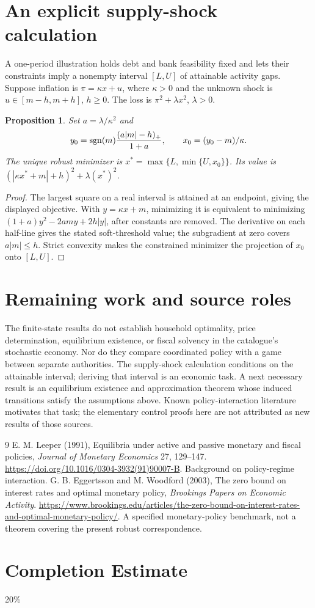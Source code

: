 \documentclass[11pt,a4paper]{article}
\newtheorem{proposition}[theorem]{Proposition}
\theoremstyle{definition}
\theoremstyle{remark}
\begin{document}
\section{An explicit supply-shock calculation}
A one-period illustration holds debt and bank feasibility fixed and lets their constraints imply a nonempty interval $[L,U]$ of attainable activity gaps. Suppose inflation is $\pi=\kappa x+u$, where $\kappa>0$ and the unknown shock is $u\in[m-h,m+h]$, $h\ge0$. The loss is $\pi^2+\lambda x^2$, $\lambda>0$.
\begin{proposition}
Set $a=\lambda/\kappa^2$ and
\[
 y_0=\operatorname{sgn}(m){(a|m|-h)_+\over1+a},
 \qquad x_0=(y_0-m)/\kappa.
\]
The unique robust minimizer is $x^*=\max\{L,\min\{U,x_0\}\}$. Its value is $(|\kappa x^*+m|+h)^2+\lambda(x^*)^2$.
\end{proposition}
\begin{proof}
The largest square on a real interval is attained at an endpoint, giving the displayed objective. With $y=\kappa x+m$, minimizing it is equivalent to minimizing
$(1+a)y^2-2amy+2h|y|$, after constants are removed. The derivative on each half-line gives the stated soft-threshold value; the subgradient at zero covers $a|m|\le h$. Strict convexity makes the constrained minimizer the projection of $x_0$ onto $[L,U]$.
\end{proof}
\section{Remaining work and source roles}
The finite-state results do not establish household optimality, price determination, equilibrium existence, or fiscal solvency in the catalogue's stochastic economy. Nor do they compare coordinated policy with a game between separate authorities. The supply-shock calculation conditions on the attainable interval; deriving that interval is an economic task. A next necessary result is an equilibrium existence and approximation theorem whose induced transitions satisfy the assumptions above. Known policy-interaction literature motivates that task; the elementary control proofs here are not attributed as new results of those sources.
\begin{thebibliography}{9}
 E. M. Leeper (1991), Equilibria under active and passive monetary and fiscal policies, \emph{Journal of Monetary Economics} 27, 129--147. \url{https://doi.org/10.1016/0304-3932(91)90007-B}. Background on policy-regime interaction.
 G. B. Eggertsson and M. Woodford (2003), The zero bound on interest rates and optimal monetary policy, \emph{Brookings Papers on Economic Activity}. \url{https://www.brookings.edu/articles/the-zero-bound-on-interest-rates-and-optimal-monetary-policy/}. A specified monetary-policy benchmark, not a theorem covering the present robust correspondence.
\end{thebibliography}

\section{Completion Estimate}
20\%
\end{document}
